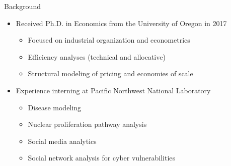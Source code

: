 \documentclass{beamer}
\begin{document}
	
\begin{frame}{Background}
\begin{itemize}
	\item Received Ph.D. in Economics from the University of Oregon in 2017
		\begin{itemize}
			\item Focused on industrial organization and econometrics
			\item Efficiency analyses (technical and allocative)
			\item Structural modeling of pricing and economies of scale
		\end{itemize}
	\item Experience interning at Pacific Northwest National Laboratory
		\begin{itemize}
			\vspace*{-3ex}
			\item Disease modeling
			\item Nuclear proliferation pathway analysis
			\item Social media analytics
			\item Social network analysis for cyber vulnerabilities
		\end{itemize}
\end{itemize}
\end{frame}
\end{document}
